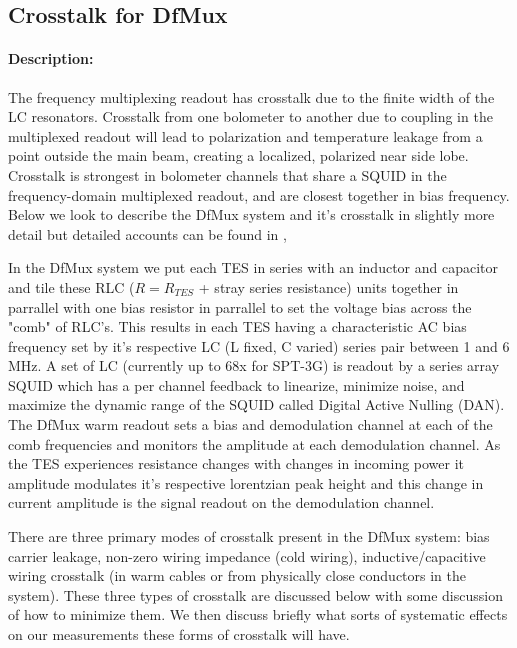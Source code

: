 \subsection{Crosstalk for DfMux}

\paragraph{Description:}
The frequency multiplexing readout has crosstalk due to the finite width of the LC resonators.
Crosstalk from one bolometer to another due to coupling in the multiplexed readout will lead to polarization and temperature leakage from a point outside the main beam, creating a localized, polarized near side lobe. Crosstalk is strongest in bolometer channels that share a SQUID in the frequency-domain multiplexed readout, and are closest together in bias frequency. Below we look to describe the DfMux system and it's crosstalk in slightly more detail but detailed accounts can be found in \cite{Barron_Thesis}, \cite{DfMux_Dobbs2012}

In the DfMux system we put each TES in series with an inductor and capacitor and tile these RLC ($R=R_{TES}$ + stray series resistance) units together in parrallel with one bias resistor in parrallel to set the voltage bias across the "comb" of RLC's. This results in each TES having a characteristic AC bias frequency set by it's respective LC (L fixed, C varied) series pair between 1 and 6 MHz. A set of LC (currently up to 68x for SPT-3G\cite{SPT3G_DfMux_Overview}) is readout by a series array SQUID which has a per channel feedback to linearize, minimize noise, and maximize the dynamic range of the SQUID called Digital Active Nulling (DAN)\cite{DfMux_LC_Production}. The DfMux warm readout sets a bias and demodulation channel at each of the comb frequencies and monitors the amplitude at each demodulation channel. As the TES experiences resistance changes with changes in incoming power it amplitude modulates it's respective lorentzian peak height and this change in current amplitude is the signal readout on the demodulation channel. 

There are three primary modes of crosstalk present in the DfMux system: bias carrier leakage, non-zero wiring impedance (cold wiring), inductive/capacitive wiring crosstalk (in warm cables or from physically close conductors in the system). These three types of crosstalk are discussed below with some discussion of how to minimize them. \cite{DAN_Crosstalk_Memo} We then discuss briefly what sorts of systematic effects on our measurements these forms of crosstalk will have. 

